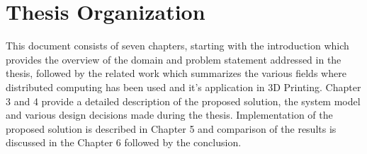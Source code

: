\section{Thesis Organization}

This document consists of seven chapters, starting with the introduction which provides the overview of the domain and problem statement addressed in the thesis, followed by the related work which summarizes the various fields where distributed computing has been used and it's application in 3D Printing. Chapter 3 and 4 provide a detailed description of the proposed solution, the system model and various design decisions made during the thesis. Implementation of the proposed solution is described in Chapter 5 and comparison of the results is discussed in the Chapter 6 followed by the conclusion. 


